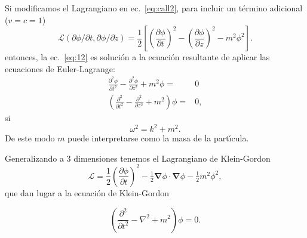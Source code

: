 Si modificamos el Lagrangiano en ec.~\eqref{eq:call2}, para incluir un
t\'ermino adicional ($v=c=1$)
\begin{equation}
  \label{eq:14}
  \mathcal{L}(\partial\phi/\partial t,\partial\phi/\partial z)=\frac{1}{2}
\left[
  \left(\frac{\partial\phi}{\partial t}\right)^2-\left(\frac{\partial\phi}{\partial z}\right)^2-m^2\phi^2
\right].
\end{equation}
entonces, la ec.~\eqref{eq:12} es soluci\'on a la ecuaci\'on resultante de
aplicar las ecuaciones de Euler-Lagrange:
\begin{align}
\label{eq:150}
      \frac{\partial^2\phi}{\partial t^2}-\frac{\partial^2\phi}{\partial z^2}+m^2\phi=&0\nonumber\\
      \left(\frac{\partial^2}{\partial t^2}-\frac{\partial^2}{\partial z^2}+m^2
      \right)\phi=&0,
\end{align}
si
\begin{equation}
  \omega^2=k^2+m^2.
\end{equation}
De este modo $m$ puede interpretarse como la masa de la part\'\i cula. 

Generalizando a 3 dimensiones tenemos el Lagrangiano de Klein-Gordon
\begin{equation}
  \label{eq:15}
  \mathcal{L}=\frac{1}{2}
  \left(
\frac{\partial\phi}{\partial t}
  \right)^2-\tfrac{1}{2}\boldsymbol{\nabla}\phi\cdot\boldsymbol{\nabla}\phi-\tfrac{1}{2}m^2\phi^2,
\end{equation}
que dan lugar a la ecuaci\'on de Klein-Gordon

\begin{equation}
\label{eq:152}
  \left(
\frac{\partial^2}{\partial t^2}-\nabla^2+m^2
  \right)\phi=0.
\end{equation}

